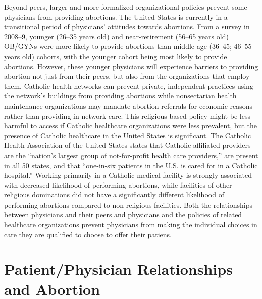 \documentclass[letterpaper, 12pt]{article}
\begin{document}
Beyond peers, larger and more formalized organizational policies prevent some physicians from providing abortions.
The United States is currently in a transitional period of physicians' attitudes towards abortions.
From a survey in 2008--9, younger (26--35 years old) and near-retirement (56--65 years old) OB/GYNs were more likely to provide abortions than middle age (36--45; 46--55 years old) cohorts, with the younger cohort being most likely to provide abortions. \autocite[pg. 611]{stulberg_abortion_2011}
However, these younger physicians will experience barriers to providing abortion not just from their peers, but also from the organizations that employ them.
Catholic health networks can prevent private, independent practices using the network's buildings from providing abortions while nonsectarian health maintenance organizations may mandate abortion referrals for economic reasons rather than providing in-network care. \autocite[pg. 149]{freedman_obstacles_2010}
This religious-based policy might be less harmful to access if Catholic healthcare organizations were less prevalent, but the presence of Catholic healthcare in the United States is significant.
The Catholic Health Association of the United States states that Catholic-affiliated providers are the ``nation’s largest group of not-for-profit health care providers,'' are present in all 50 states, and that ``one-in-six patients in the U.S. is cared for in a Catholic hospital.''  \autocite{the_catholic_health_association_of_the_united_states_catholic_2016}
Working primarily in a Catholic medical facility is strongly associated with decreased likelihood of performing abortions, while facilities of other religious dominations did not have a significantly different likelihood of performing abortions compared to non-religious facilities. \autocite[pg. 612]{stulberg_abortion_2011}
Both the relationships between physicians and their peers and physicians and the policies of related healthcare organizations prevent physicians from making the individual choices in care they are qualified to choose to offer their patiens.

\section*{Patient/Physician Relationships and Abortion}
\end{document}
